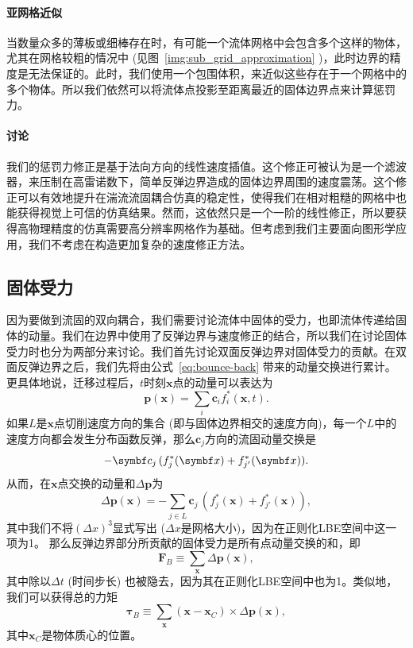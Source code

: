 \paragraph{亚网格近似}
当数量众多的薄板或细棒存在时，有可能一个流体网格中会包含多个这样的物体，尤其在网格较粗的情况中 (见图~\ref{img:sub_grid_approximation} )，此时边界的精度是无法保证的。此时，我们使用一个包围体积，来近似这些存在于一个网格中的多个物体。所以我们依然可以将流体点投影至距离最近的固体边界点来计算惩罚力。

\paragraph{讨论}
我们的惩罚力修正是基于法向方向的线性速度插值。这个修正可被认为是一个滤波器，来压制在高雷诺数下，简单反弹边界造成的固体边界周围的速度震荡。这个修正可以有效地提升在湍流流固耦合仿真的稳定性，使得我们在相对粗糙的网格中也能获得视觉上可信的仿真结果。然而，这依然只是一个一阶的线性修正，所以要获得高物理精度的仿真需要高分辨率网格作为基础。但考虑到我们主要面向图形学应用，我们不考虑在构造更加复杂的速度修正方法。

\subsection{固体受力}
因为要做到流固的双向耦合，我们需要讨论流体中固体的受力，也即流体传递给固体的动量。我们在边界中使用了反弹边界与速度修正的结合，所以我们在讨论固体受力时也分为两部分来讨论。我们首先讨论双面反弹边界对固体受力的贡献。在双面反弹边界之后，我们先将由公式~\ref{eq:bounce-back} 带来的动量交换进行累计。更具体地说，迁移过程后，$t$时刻$\bm{x}$点的动量可以表达为
\begin{equation}
  \bm{p}(\bm{x}) = \sum_{i}\bm{c}_if^*_i(\bm{x},t).
\end{equation}
如果$L$是$\bm{x}$点切削速度方向的集合 (即与固体边界相交的速度方向)，每一个$L$中的速度方向都会发生分布函数反弹，那么$\bm{c}_j$方向的流固动量交换是
\begin{equation}
  \smash{-\bm{c}_{j}\,(f^*_{j}(\bm{x}) + f^*_{j'}(\bm{x}))}.
\end{equation}
从而，在$\bm{x}$点交换的动量和$\Delta \bm{p}$为
\begin{equation}
\Delta \bm{p}(\bm{x})= - \sum_{j\in L} \bm{c}_{j}\,(f^*_{j}(\bm{x}) + f^*_{j'}(\bm{x})),
\end{equation}
其中我们不将$(\Delta x)^3$显式写出 ($\Delta x$是网格大小)，因为在正则化LBE空间中这一项为1。
那么反弹边界部分所贡献的固体受力是所有点动量交换的和，即
\begin{equation}
\bm{F}_{B}\equiv \sum_{\bm{x}} \Delta \bm{p}(\bm{x}),
\end{equation}
其中除以$\Delta t$ (时间步长) 也被隐去，因为其在正则化LBE空间中也为1。类似地，我们可以获得总的力矩
\begin{equation}
\bm{\tau}_{B}\equiv \sum_{\bm{x}} (\bm{x}-\bm{x}_{C})\times\Delta \bm{p}(\bm{x}),
\end{equation}
其中$\bm{x}_{C}$是物体质心的位置。

